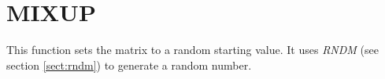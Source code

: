 \section{MIXUP}
\label{sect:mixup}

\noindent This function sets the matrix to a random starting value. It uses
{\em RNDM} (see section \ref{sect:rndm}) to generate a random number.\\
